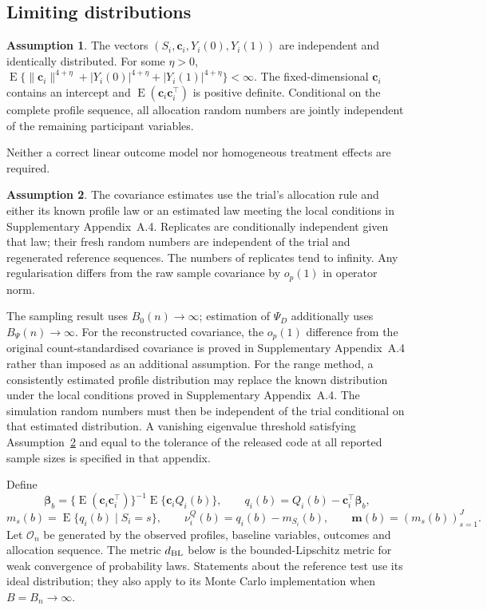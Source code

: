 \documentclass[12pt,a4paper]{article}
\theoremstyle{definition}
\newtheorem{assumption}{Assumption}
\newcommand{\E}{\operatorname E}
\begin{document}
\subsection{Limiting distributions}
\begin{assumption}\label{ass:main-participants}
The vectors $(S_i,\bm c_i,Y_i(0),Y_i(1))$ are independent and identically distributed. For some $\eta>0$, $\E\{\|\bm c_i\|^{4+\eta}+|Y_i(0)|^{4+\eta}+|Y_i(1)|^{4+\eta}\}<\infty$. The fixed-dimensional $\bm c_i$ contains an intercept and $\E(\bm c_i\bm c_i^\top)$ is positive definite. Conditional on the complete profile sequence, all allocation random numbers are jointly independent of the remaining participant variables.
\end{assumption}
Neither a correct linear outcome model nor homogeneous treatment effects are required.

\begin{assumption}\label{ass:main-calibration}
The covariance estimates use the trial's allocation rule and either its known profile law or an estimated law meeting the local conditions in Supplementary Appendix~A.4. Replicates are conditionally independent given that law; their fresh random numbers are independent of the trial and regenerated reference sequences. The numbers of replicates tend to infinity. Any regularisation differs from the raw sample covariance by $o_p(1)$ in operator norm.
\end{assumption}
The sampling result uses $B_0(n)\to\infty$; estimation of $\Psi_D$ additionally uses $B_\Psi(n)\to\infty$. For the reconstructed covariance, the $o_p(1)$ difference from the original count-standardised covariance is proved in Supplementary Appendix~A.4 rather than imposed as an additional assumption. For the range method, a consistently estimated profile distribution may replace the known distribution under the local conditions proved in Supplementary Appendix~A.4. The simulation random numbers must then be independent of the trial conditional on that estimated distribution. A vanishing eigenvalue threshold satisfying Assumption~\ref{ass:main-calibration} and equal to the tolerance of the released code at all reported sample sizes is specified in that appendix.

Define
\[
 \bm\beta_b=\{\E(\bm c_i\bm c_i^\top)\}^{-1}\E\{\bm c_iQ_i(b)\},\qquad
 q_i(b)=Q_i(b)-\bm c_i^\top\bm\beta_b,
\]
\[
 m_s(b)=\E\{q_i(b)\mid S_i=s\},\qquad
 \nu_i^Q(b)=q_i(b)-m_{S_i}(b),\qquad \bm m(b)=(m_s(b))_{s=1}^J.
\]
Let $\mathcal O_n$ be generated by the observed profiles, baseline variables, outcomes and allocation sequence. The metric $d_{\rm BL}$ below is the bounded-Lipschitz metric for weak convergence of probability laws. Statements about the reference test use its ideal distribution; they also apply to its Monte Carlo implementation when $B=B_n\to\infty$.
\end{document}
